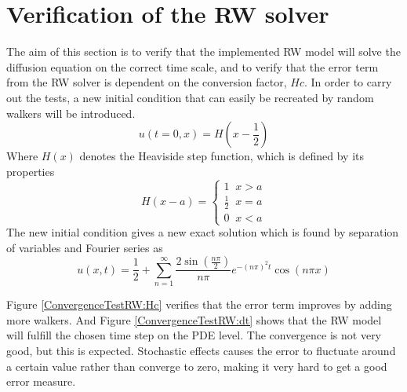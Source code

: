 \section{Verification of the RW solver}

The aim of this section is to verify that the implemented RW model will solve the diffusion equation on the correct time scale, and to verify that the error term from the RW solver is dependent on the conversion factor, $Hc$. 
In order to carry out the tests, a new initial condition that can easily be recreated by random walkers will be introduced.
\begin{equation}
 u(t=0,x) = H\left(x-\frac{1}{2}\right)
\end{equation}
\noindent Where $H(x)$ denotes the Heaviside step function, which is defined by its properties
\begin{equation}\label{Heaviside_def}
 H(x-a) = \begin{cases}
           1\;\;x > a\\
           \frac{1}{2}\;\; x = a\\ 
           0\;\;x < a
          \end{cases}
\end{equation}
\noindent The new initial condition gives a new exact solution which is found by separation of variables and Fourier series as 
\begin{equation}
 u(x,t) = \frac{1}{2} + \sum\limits_{n=1}^\infty \frac{2\sin(\frac{n\pi}{2})}{n\pi}e^{-(n\pi)^2t}\cos(n\pi x)
\end{equation}

\noindent Figure \ref{ConvergenceTestRW:Hc} verifies that the error term improves by adding more walkers. And Figure \ref{ConvergenceTestRW:dt} shows that the RW model will fulfill the chosen time step on the PDE level. 
The convergence is not very good, but this is expected. 
Stochastic effects causes the error to fluctuate around a certain value rather than converge to zero, making it very hard to get a good error measure.

